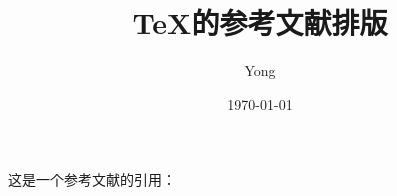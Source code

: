 \documentclass{article}
\title{\TeX 的参考文献排版}
\author{Yong}
\date{\today}
\begin{document}
	\maketitle
	
	这是一个参考文献的引用：\cite{Yu2016SeqGAN}
	
\end{document}
